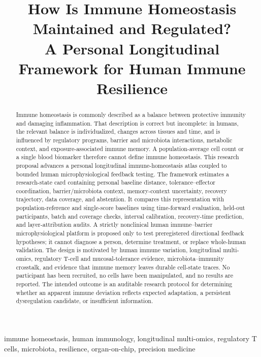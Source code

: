 \documentclass[conference]{IEEEtran}
\begin{document}
\title{How Is Immune Homeostasis Maintained and Regulated?\\
A Personal Longitudinal Framework for Human Immune Resilience}

\author{
}

\maketitle

\begin{abstract}
Immune homeostasis is commonly described as a balance between protective immunity and damaging inflammation. That description is correct but incomplete: in humans, the relevant balance is individualized, changes across tissues and time, and is influenced by regulatory programs, barrier and microbiota interactions, metabolic context, and exposure-associated immune memory. A population-average cell count or a single blood biomarker therefore cannot define immune homeostasis. This research proposal advances a personal longitudinal immune-homeostasis atlas coupled to bounded human microphysiological feedback testing. The framework estimates a research-state card containing personal baseline distance, tolerance--effector coordination, barrier/microbiota context, memory-context uncertainty, recovery trajectory, data coverage, and abstention. It compares this representation with population-reference and single-score baselines using time-forward evaluation, held-out participants, batch and coverage checks, interval calibration, recovery-time prediction, and layer-attribution audits. A strictly nonclinical human immune--barrier microphysiological platform is proposed only to test preregistered directional feedback hypotheses; it cannot diagnose a person, determine treatment, or replace whole-human validation. The design is motivated by human immune variation, longitudinal multi-omics, regulatory T-cell and mucosal-tolerance evidence, microbiota--immunity crosstalk, and evidence that immune memory leaves durable cell-state traces. No participant has been recruited, no cells have been manipulated, and no results are reported. The intended outcome is an auditable research protocol for determining whether an apparent immune deviation reflects expected adaptation, a persistent dysregulation candidate, or insufficient information.
\end{abstract}

\begin{IEEEkeywords}
immune homeostasis, human immunology, longitudinal multi-omics, regulatory T cells, microbiota, resilience, organ-on-chip, precision medicine
\end{IEEEkeywords}
\end{document}

